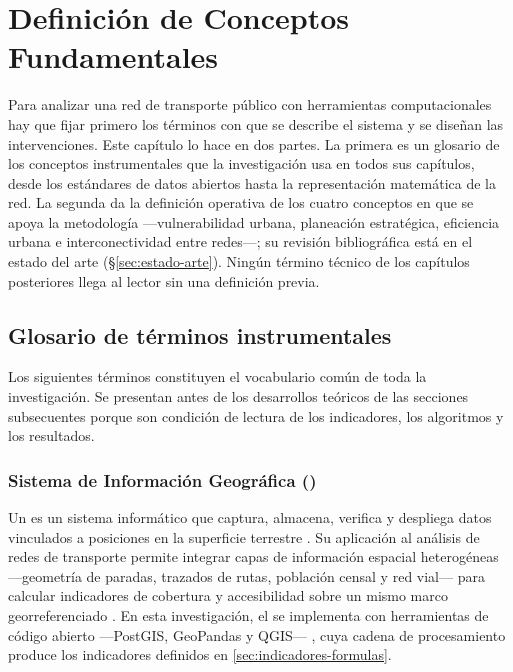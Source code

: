 

\section{Definición de Conceptos Fundamentales}
\label{sec:conceptos-fundamentales}

Para analizar una red de transporte público con herramientas computacionales
hay que fijar primero los términos con que se describe el sistema y se diseñan
las intervenciones. Este capítulo lo hace en dos partes. La primera es un
glosario de los conceptos instrumentales que la investigación usa en todos sus
capítulos, desde los estándares de datos abiertos hasta la representación
matemática de la red. La segunda da la definición operativa de los cuatro
conceptos en que se apoya la metodología ---vulnerabilidad urbana, planeación
estratégica, eficiencia urbana e interconectividad entre redes---; su revisión
bibliográfica está en el estado del arte (§\ref{sec:estado-arte}). Ningún
término técnico de los capítulos posteriores llega al lector sin una definición
previa.

\subsection{Glosario de términos instrumentales}
\label{subsec:glosario-instrumental}

Los siguientes términos constituyen el vocabulario común de toda la
investigación. Se presentan antes de los desarrollos teóricos de las secciones
subsecuentes porque son condición de lectura de los indicadores, los algoritmos
y los resultados.

\subsubsection*{Sistema de Información Geográfica (\gis{})}
\label{subsubsec:glosario-gis}
Un \gis{} es un sistema informático que captura, almacena, verifica y despliega
datos vinculados a posiciones en la superficie terrestre \citep{longley2015}. Su
aplicación al análisis de redes de transporte permite integrar capas de
información espacial heterogéneas ---geometría de paradas, trazados de rutas,
población censal y red vial--- para calcular indicadores de cobertura y
accesibilidad sobre un mismo marco georreferenciado \citep{ugur2025}. En esta
investigación, el \gis{} se implementa con herramientas de código abierto
---PostGIS, GeoPandas y QGIS--- \citep{mappinggis2024, mappinggis2020}, cuya cadena de procesamiento produce los
indicadores definidos en \autoref{sec:indicadores-formulas}.

